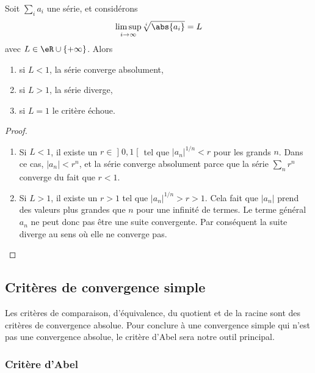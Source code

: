 \begin{proposition}
	Soit \( \sum_i a_i\) une série, et considérons
	\begin{equation*}
		\limsup_{i \rightarrow \infty} \sqrt[i]{\abs{a_i}} = L
	\end{equation*}
	avec \( L\in \eR\cup\{ +\infty \}\). Alors
	\begin{enumerate}
		\item si \(L < 1\), la série converge absolument,
		\item si \(L > 1\), la série diverge,
		\item si \(L = 1\) le critère échoue.
	\end{enumerate}
\end{proposition}

\begin{proof}
	\begin{enumerate}
		\item
		      Si \( L<1\), il existe un \( r\in \mathopen] 0 , 1 \mathclose[\) tel que \( | a_n |^{1/n}<r\) pour les grands \( n\). Dans ce cas, \( | a_n |<r^{n}\), et la série converge absolument parce que la série \( \sum_nr^n\) converge du fait que \( r<1\).
		\item
		      Si \( L>1\), il existe un \( r>1\) tel que \( | a_n |^{1/n}>r>1\). Cela fait que \( | a_n |\) prend des valeurs plus grandes que \( n\) pour une infinité de termes. Le terme général \( a_n\) ne peut donc pas être une suite convergente. Par conséquent la suite diverge au sens où elle ne converge pas.

	\end{enumerate}
\end{proof}

\subsection{Critères de convergence simple}

Les critères de comparaison, d'équivalence, du quotient et de la racine sont des critères de convergence absolue. Pour conclure à une convergence simple qui n'est pas une convergence absolue, le critère d'Abel sera notre outil principal.

\subsubsection{Critère d'Abel}

